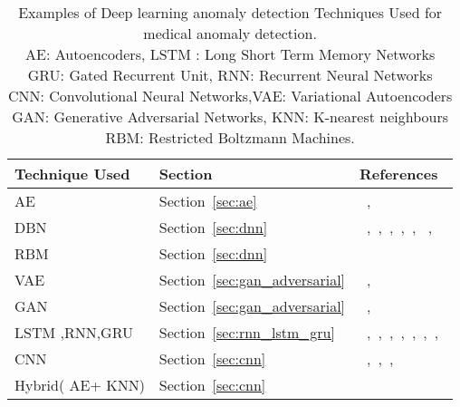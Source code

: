 \begin{table*}
\begin{center}
  \caption{Examples of Deep learning anomaly detection Techniques Used for medical anomaly detection.
          \\AE: Autoencoders, LSTM : Long Short Term Memory Networks
          \\GRU: Gated Recurrent Unit, RNN: Recurrent Neural Networks
          \\CNN: Convolutional Neural Networks,VAE: Variational Autoencoders
          \\GAN: Generative Adversarial Networks, KNN: K-nearest neighbours
          \\RBM: Restricted Boltzmann Machines.}
  \label{tab:medicalanomalyDetect}
    \begin{tabular}{ | l | p{4cm} | p{7cm} |}
    \hline
    Technique Used & Section & References \\ \hline
     AE  & Section~\ref{sec:ae} & ~\cite{wang2016research,cowton2018combined},~\cite{sato2018primitive}\\\hline
     DBN & Section~\ref{sec:dnn} & ~\cite{turner2014deep},~\cite{sharma2016abnormality},~\cite{wulsin2010semi},~\cite{ma2018unsupervised},~\cite{zhang2016automatic},~\cite{wulsin2011modeling} ,~\cite{wu2015adaptive}\\\hline
     RBM & Section~\ref{sec:dnn}  & ~\cite{liao2016enhanced}\\\hline
     VAE & Section~\ref{sec:gan_adversarial} & ~\cite{xu2018unsupervised},~\cite{lu2018anomaly} \\\hline
     GAN & Section~\ref{sec:gan_adversarial}&~\cite{ghasedi2018semi},~\cite{chen2018unsupervised} \\\hline
     LSTM ,RNN,GRU & Section~\ref{sec:rnn_lstm_gru} & ~\cite{yang2018toward},~\cite{jagannatha2016bidirectional},~\cite{cowton2018combined},~\cite{o2016recurrent},~\cite{latif2018phonocardiographic},~\cite{zhang2018time},~\cite{chauhan2015anomaly},~\cite{gugulothusparse,amarasinghe2018toward}\\\hline
     CNN  & Section~\ref{sec:cnn} & ~\cite{schmidt2018artificial},~\cite{esteva2017dermatologist},~\cite{wang2016research},~\cite{iakovidis2018detecting}\\\hline
     Hybrid( AE+ KNN) & Section~\ref{sec:cnn} & ~\cite{song2017hybrid} \\\hline
    \end{tabular}
\end{center}
\end{table*}







